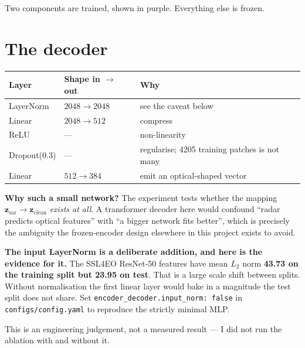 \documentclass[11pt,a4paper]{report}
\newcommand{\file}[1]{\texttt{\small #1}}
\newcommand{\code}[1]{\texttt{\small #1}}
\newcommand{\zc}{\mathbf{z}_{\text{clean}}}
\newcommand{\zs}{\mathbf{z}_{\text{sar}}}
\begin{document}
\begin{center}
\end{center}

Two components are trained, shown in purple. Everything else is frozen.

\section{The decoder}

\begin{center}
\small
\begin{tabular}{@{}lll@{}}
\toprule
\textbf{Layer} & \textbf{Shape in $\rightarrow$ out} & \textbf{Why} \\
\midrule
LayerNorm & $2048 \rightarrow 2048$ & see the caveat below \\
Linear & $2048 \rightarrow 512$ & compress \\
ReLU & --- & non-linearity \\
Dropout(0.3) & --- & regularise; 4205 training patches is not many \\
Linear & $512 \rightarrow 384$ & emit an optical-shaped vector \\
\bottomrule
\end{tabular}
\end{center}

\begin{whybox}
\textbf{Why such a small network?} The experiment tests whether the mapping
$\zs \rightarrow \zc$ \emph{exists at all}. A transformer decoder here would
confound ``radar predicts optical features'' with ``a bigger network fits
better'', which is precisely the ambiguity the frozen-encoder design elsewhere in
this project exists to avoid.
\end{whybox}

\begin{flagbox}
\textbf{The input LayerNorm is a deliberate addition, and here is the evidence
for it.} The SSL4EO ResNet-50 features have mean $L_2$ norm \textbf{43.73 on the
training split but 23.95 on test}. That is a large scale shift between splits.
Without normalisation the first linear layer would bake in a magnitude the test
split does not share. Set \code{encoder\_decoder.input\_norm: false} in
\file{configs/config.yaml} to reproduce the strictly minimal MLP.

\medskip
This is an engineering judgement, not a measured result --- I did not run the
ablation with and without it.
\end{flagbox}
\end{document}

